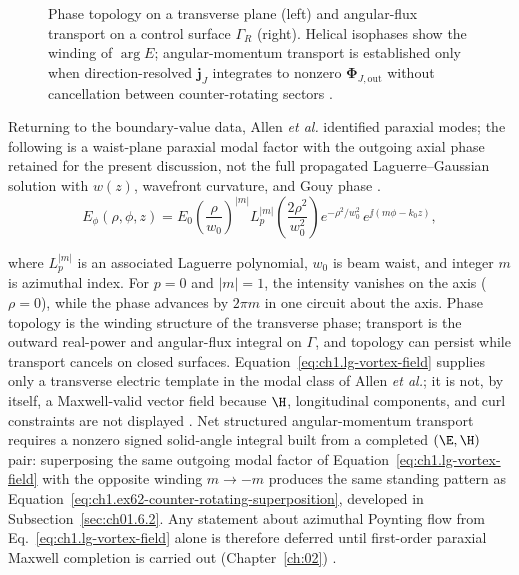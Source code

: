 \begin{figure}[t]
{%
}
\caption{Phase topology on a transverse plane (left) and angular-flux transport on a control surface $\Gamma_R$ (right). Helical isophases show the winding of $\arg E$; angular-momentum transport is established only when direction-resolved $\mathbf{j}_J$ integrates to nonzero $\boldsymbol{\Phi}_{J,\mathrm{out}}$ without cancellation between counter-rotating sectors \cite{allen1992,beth1936}.}
\label{fig:ch1.phase-vs-transport-sketch}
\end{figure}

Returning to the boundary-value data, Allen \emph{et al.} \cite{allen1992} identified paraxial modes; the following is a waist-plane paraxial modal factor with the outgoing axial phase retained for the present discussion, not the full propagated Laguerre--Gaussian solution with $w(z)$, wavefront curvature, and Gouy phase \cite{allen1992}.
\begin{equation}
\label{eq:ch1.phase-winding-number}E_\phi(\rho,\phi,z)
=
E_0
\left(\frac{\rho}{w_0}\right)^{|m|}
L_p^{|m|}\!\left(\frac{2\rho^2}{w_0^2}\right)
e^{-\rho^2/w_0^2}\,
e^{\jj(m\phi-k_0 z)},
\end{equation}
\addtocounter{equation}{-1}\label{eq:ch1.lg-vortex-field}%
where \(L_p^{|m|}\) is an associated Laguerre polynomial, \(w_0\) is beam waist,
and integer \(m\) is azimuthal index. For \(p=0\) and \(|m|=1\), the intensity vanishes
on the axis (\(\rho=0\)), while the phase advances by \(2\pi m\) in one circuit about the axis.
Phase topology is the winding structure of the transverse phase; transport is the outward real-power and angular-flux integral on \(\Gamma\), and topology can persist while transport cancels on closed surfaces. Equation~\eqref{eq:ch1.lg-vortex-field} supplies only a transverse electric template in the modal class of Allen \emph{et al.}; it is not, by itself, a Maxwell-valid vector field because $\H$, longitudinal components, and curl constraints are not displayed \cite{allen1992,stratton1941}. Net structured angular-momentum transport requires a nonzero signed solid-angle integral built from a completed $(\E,\H)$ pair: superposing the same outgoing modal factor of Equation~\eqref{eq:ch1.lg-vortex-field} with the opposite winding $m\to -m$ produces the same standing pattern as Equation~\eqref{eq:ch1.ex62-counter-rotating-superposition}, developed in Subsection~\ref{sec:ch01.6.2}. Any statement about azimuthal Poynting flow from Eq.~\eqref{eq:ch1.lg-vortex-field} alone is therefore deferred until first-order paraxial Maxwell completion is carried out (Chapter~\ref{ch:02}) \cite{allen1992,harrington2001}.

